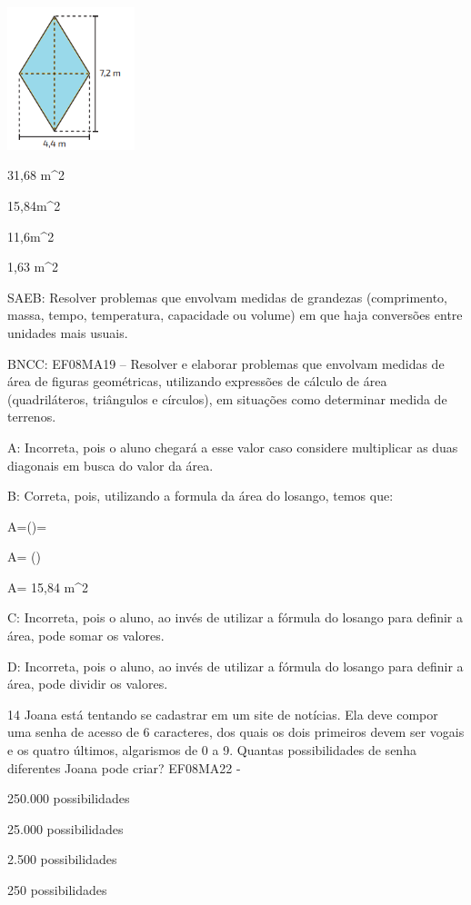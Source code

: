 {\includegraphics[width=1.45833in,height=1.63333in]{./imgSAEB_8_MAT/media/image59.png}
\item 31,68 m^2
\item 15,84m^2
\item 11,6m^2
\item 1,63 m^2

SAEB: Resolver problemas que envolvam medidas de grandezas (comprimento,
massa, tempo, temperatura, capacidade ou volume) em que haja conversões
entre unidades mais usuais.

BNCC: EF08MA19 -- Resolver e elaborar problemas que envolvam medidas de
área de figuras geométricas, utilizando expressões de cálculo de área
(quadriláteros, triângulos e círculos), em situações como determinar
medida de terrenos.

A: Incorreta, pois o aluno chegará a esse valor caso considere
multiplicar as duas diagonais em busca do valor da área.

B: Correta, pois, utilizando a formula da área do losango, temos que:

A=()=

A= ()

A= 15,84 m^2

C: Incorreta, pois o aluno, ao invés de utilizar a fórmula do losango
para definir a área, pode somar os valores.

D: Incorreta, pois o aluno, ao invés de utilizar a fórmula do losango
para definir a área, pode dividir os valores.

\num{14} Joana está tentando se cadastrar em um site de notícias. Ela deve
compor uma senha de acesso de 6 caracteres, dos quais os dois primeiros
devem ser vogais e os quatro últimos, algarismos de 0 a 9. Quantas
possibilidades de senha diferentes Joana pode criar? EF08MA22 -
\item 250.000 possibilidades
\item 25.000 possibilidades
\item 2.500 possibilidades
\item 250 possibilidades

}
